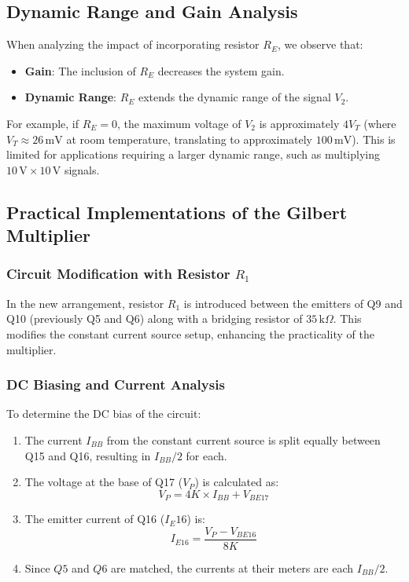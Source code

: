 \subsection{Dynamic Range and Gain Analysis}

When analyzing the impact of incorporating resistor $R_E$, we observe that:
\begin{itemize}
    \item \textbf{Gain}: The inclusion of $R_E$ decreases the system gain.
    \item \textbf{Dynamic Range}: $R_E$ extends the dynamic range of the signal $V_2$.
\end{itemize}

For example, if $R_E = 0$, the maximum voltage of $V_2$ is approximately $4V_T$ (where $V_T \approx 26\,\text{mV}$ at room temperature, translating to approximately $100\,\text{mV}$). This is limited for applications requiring a larger dynamic range, such as multiplying $10\,\text{V} \times 10\,\text{V}$ signals.

\subsection{Practical Implementations of the Gilbert Multiplier}

\subsubsection{Circuit Modification with Resistor $R_1$}

In the new arrangement, resistor $R_1$ is introduced between the emitters of Q9 and Q10 (previously Q5 and Q6) along with a bridging resistor of $35\,\text{k}\Omega$. This modifies the constant current source setup, enhancing the practicality of the multiplier.

\subsubsection{DC Biasing and Current Analysis}

To determine the DC bias of the circuit:
\begin{enumerate}
    \item The current $I_{BB}$ from the constant current source is split equally between Q15 and Q16, resulting in $I_{BB}/2$ for each.
    \item The voltage at the base of Q17 ($V_P$) is calculated as:
    \[
    V_P = 4K \times I_{BB} + V_{BE17}
    \]
    \item The emitter current of Q16 ($I_E16$) is:
    \[
    I_{E16} = \frac{V_P - V_{BE16}}{8K}
    \]
    \item Since $Q5$ and $Q6$ are matched, the currents at their meters are each $I_{BB}/2$.
\end{enumerate}

